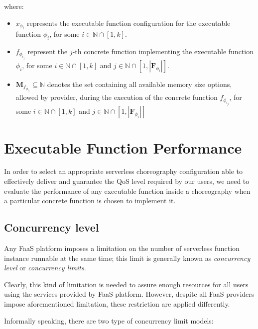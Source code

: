 \documentclass[10pt,a4paper]{report}
\newcommand*{\N}{\mathbb{N}}
\theoremstyle{definition}
\begin{document}
where:

\begin{itemize}
	\item $x_{\phi_{i}}$ represents the executable function configuration for the executable function $\phi_{i}$, for some  $i \in \N \cap \left[ 1, k \right]$.
	
	\item $f_{\phi_{i_j}}$ represent the $j$-th concrete function implementing the executable function $\phi_{i}$, for some  $i \in \N \cap \left[ 1, k \right]$ and $j \in \N \cap \left[ 1, |\textbf{F}_{\phi_{i}}| \right]$.
	
	\item $\textbf{M}_{f_{\phi_{i_j}}} \subseteq \N$ denotes the set containing all available memory size options, allowed by provider, during the execution of the concrete function $f_{\phi_{i_j}}$, for some $i \in \N \cap \left[ 1, k \right]$ and $j \in \N \cap \left[ 1, |\textbf{F}_{\phi_{i}}| \right]$
\end{itemize}

\section{Executable Function Performance}

In order to select an appropriate serverless choreography configuration able to effectively deliver and guarantee the QoS level required by our users, we need to evaluate the performance of any executable function inside a choreography when a particular concrete function is chosen to implement it. 

\subsection{Concurrency level}

Any FaaS platform imposes a limitation on the number of serverless function instance runnable at the same time; this limit is generally known as \textit{concurrency level} or \textit{concurrency limits}. 

Clearly, this kind of limitation is needed to assure enough resources for all users using the services provided by FaaS platform. However, despite all FaaS providers impose aforementioned limitation, these restriction are applied differently.

Informally speaking, there are two type of concurrency limit models:
\end{document}
